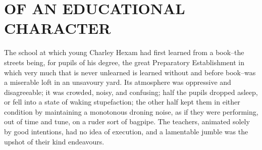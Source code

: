 
\chapter{OF AN EDUCATIONAL CHARACTER}

The school at which young Charley Hexam had first learned from a
book--the streets being, for pupils of his degree, the great Preparatory
Establishment in which very much that is never unlearned is learned
without and before book--was a miserable loft in an unsavoury yard. Its
atmosphere was oppressive and disagreeable; it was crowded, noisy,
and confusing; half the pupils dropped asleep, or fell into a state of
waking stupefaction; the other half kept them in either condition by
maintaining a monotonous droning noise, as if they were performing, out
of time and tune, on a ruder sort of bagpipe. The teachers, animated
solely by good intentions, had no idea of execution, and a lamentable
jumble was the upshot of their kind endeavours.

